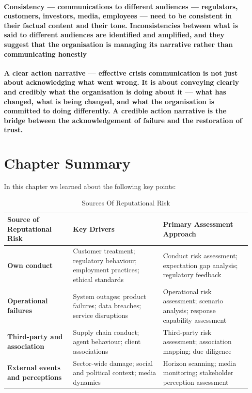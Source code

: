 \paragraph{\textbf{Consistency} — communications to different audiences — regulators, customers, investors, media, employees — need to be consistent in their factual content and their tone. Inconsistencies between what is said to different audiences are identified and amplified, and they suggest that the organisation is managing its narrative rather than communicating honestly}
\paragraph{\textbf{A clear action narrative — effective crisis communication is not just about acknowledging what went wrong. It is about conveying clearly and credibly what the organisation is doing about it — what has changed, what is being changed, and what the organisation is committed to doing differently. A credible action narrative is the bridge between the acknowledgement of failure and the restoration of trust.}}

\newpage
\section{Chapter Summary}
In this chapter we learned about the following key points:

\begin{table}[H]
  \centering
  \renewcommand{\arraystretch}{1.5}
  \begin{tabularx}{\textwidth}{ | >{\raggedright\arraybackslash}p{} 
								| >{\raggedright\arraybackslash}p{} 
                                | >{\raggedright\arraybackslash}X | }
    \hline
    \textbf{Source of Reputational Risk} & \textbf{Key Drivers} & \textbf{Primary Assessment Approach} \\
    \hline
    \textbf{Own conduct} & Customer treatment; regulatory behaviour; employment practices; ethical standards & Conduct risk assessment; expectation gap analysis; regulatory feedback\\
    \hline
    \textbf{Operational failures} & System outages; product failures; data breaches; service disruptions & Operational risk assessment; scenario analysis; response capability assessment\\
    \hline
    \textbf{Third-party and association} & Supply chain conduct; agent behaviour; client associations & Third-party risk assessment; association mapping; due diligence\\
    \hline
    \textbf{External events and perceptions} & Sector-wide damage; social and political context; media dynamics & Horizon scanning; media monitoring; stakeholder perception assessment\\
    \hline
  \end{tabularx}
  \caption{Sources Of Reputational Risk}
\end{table}

